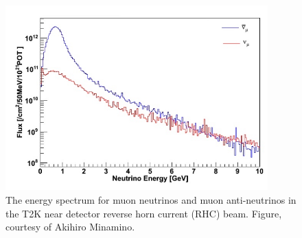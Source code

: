 



\begin{figure}[h!]
\centering
\includegraphics[width=0.9\textwidth]{figures/WAGASCIflux.jpeg}
\caption{The energy spectrum for muon neutrinos and muon anti-neutrinos in the T2K near detector reverse horn current (RHC) beam. Figure, courtesy of Akihiro Minamino.}
\label{fig:T2KndSpectrum}
\end{figure}

